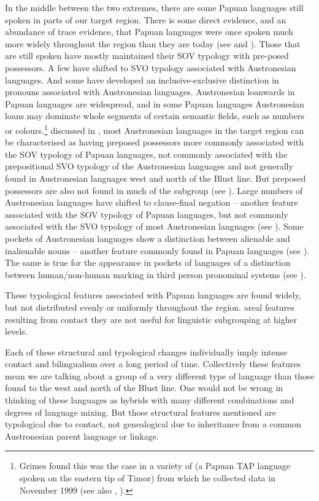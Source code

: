 In the middle between the two extremes,
there are some Papuan languages still spoken in parts of our target region.
There is some direct evidence,
and an abundance of trace evidence,
that Papuan languages were once spoken much more widely throughout
the region than they are today (see  and ).
Those that are still spoken have mostly maintained their SOV
typology with pre-posed possessors.
A few have shifted to SVO typology associated with Austronesian languages.
And some have developed an inclusive-exclusive distinction in
 pronouns associated with Austronesian languages.
Austronesian loanwards in Papuan languages are widespread,
and in some Papuan languages Austronesian loans may dominate
whole segments of certain semantic fields,
such as numbers or colours.\footnote{
		Grimes found this was the
		case in a variety of  (a Papuan TAP language spoken on
		the eastern tip of Timor) from which he collected data in November
		1999 (see also \cite[26]{Heston2015}, \cite{UsherSchapper2018,UsherSchapper2022}).} 
 discussed in ,
most Austronesian languages in the target region can be characterised
as having preposed possessors more commonly associated with the
SOV typology of Papuan languages,
not commonly associated with the prepositional SVO typology of
the Austronesian languages and not generally found in Austronesian languages west
and north of the Blust line.
But preposed possessors are also not found in much of the  subgroup (see ).
Large numbers of Austronesian languages have shifted to clause-final
negation -- another feature associated with the SOV typology of
Papuan languages, but not commonly associated with the SVO typology of most Austronesian languages (see ).
Some pockets of Austronesian languages show a distinction between
alienable and inalienable nouns -- another feature commonly found in Papuan languages (see ).
The same is true for the appearance in pockets of languages of
a distinction between human/non-human marking in third person
pronominal systems (see ).

These typological features associated with Papuan languages are
found widely, but not distributed evenly or uniformly throughout the region.
 areal features resulting from contact they are not useful
for linguistic subgrouping at higher levels.

Each of these structural
and typological changes individually imply intense contact
and bilingualism over a long period of time.
Collectively these features mean we are talking about a group
of a very different type of language than those found to the
west and north of the Blust line.
One would not be wrong in thinking of these languages as hybrids
with many different combinations
and degrees of language mixing.
But those structural features mentioned are typological due to
contact, not genealogical due to inheritance from a common Austronesian
parent language or linkage.

